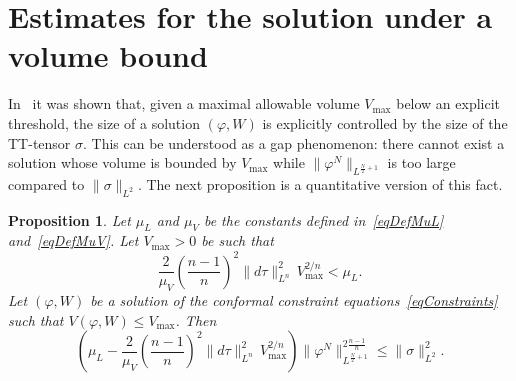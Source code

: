 \documentclass[a4paper, 10pt, reqno]{amsart}
\theoremstyle{plain}
\newtheorem{proposition}[thm]{Proposition}
\theoremstyle{remark}
\theoremstyle{definition}
\renewcommand{\phi}{\varphi}
\begin{document}
\section{Estimates for the solution under a volume bound}\label{secVolumeBound}
In~\cite{GicquaudUniqueness} it was shown that, given a maximal allowable
volume $V_{\max}$ below an explicit threshold, the size of a solution
$(\phi,W)$ is explicitly controlled by the size of the TT-tensor $\sigma$. This
can be understood as a gap phenomenon: there cannot exist a solution whose
volume is bounded by $V_{\max}$ while $\|\phi^N\|_{L^{\frac{N}{2}+1}}$ is too
large compared to $\|\sigma\|_{L^2}$. The next proposition is a quantitative
version of this fact.

\begin{proposition}\label{propVolumeBound}
	Let $\mu_L$ and $\mu_V$ be the constants defined in~\eqref{eqDefMuL}
	and~\eqref{eqDefMuV}. Let $V_{\max}>0$ be such that
	\[
		\frac{2}{\mu_V}\left(\frac{n-1}{n}\right)^2 \|d\tau\|_{L^n}^2\, V_{\max}^{2/n}
		< \mu_L.
	\]
	Let $(\phi,W)$ be a solution of the conformal constraint
	equations~\eqref{eqConstraints} such that $V(\phi,W)\leq V_{\max}$. Then
	\begin{equation}\label{eqVolumeBound}
		\left(
		\mu_L
		-\frac{2}{\mu_V}\left(\frac{n-1}{n}\right)^2 \|d\tau\|_{L^n}^2\, V_{\max}^{2/n}
		\right)
		\|\phi^N\|_{L^{\frac N2+1}}^{2\frac{n-1}{n}}
		\leq\|\sigma\|_{L^2}^2.
	\end{equation}
\end{proposition}
\end{document}
